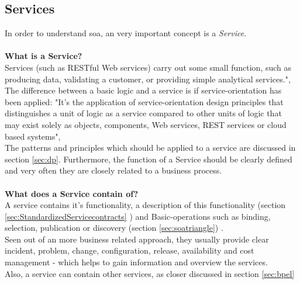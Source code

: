 \documentclass[12pt]{article}
\begin{document}
\subsection{Services} \label{sec:service}
In order to understand \gls{soa}, an very important concept is a \textit{Service}. \\
\\
\textbf{What is a Service?}\\
Services (such as RESTful Web services) carry out some small function, such as producing data, validating a customer, or providing simple analytical services.",\cite{searchsoa} \\ The difference between a basic logic and a service is if service-orientation has been applied:
"It's the application of service-orientation design principles that distinguishes a unit of logic as a service compared to other units of logic that may exist solely as objects, components, Web services, REST services or cloud based systems",\cite[page 29]{grau}\\ The patterns and principles which should be applied to a service are discussed in section \ref{sec:dp}. Furthermore, the function of a Service should be clearly defined and very often they are closely related to a business process.  \\\\
\textbf{What does a Service contain of?}\\
A service contains it's functionality, a description of this functionality (section \ref{sec:StandardizedServicecontracts} ) and Basic-operations such as binding, selection, publication or discovery (section \ref{sec:soatriangle}) \cite[page 8]{soagoesreal}. \\
Seen out of an more business related approach, they usually provide clear incident, problem, change, configuration, release, availability and cost management - which helps to gain information and overview the services.\\
Also, a service can contain other services, as closer discussed in section \ref{sec:bpel}
\end{document}
